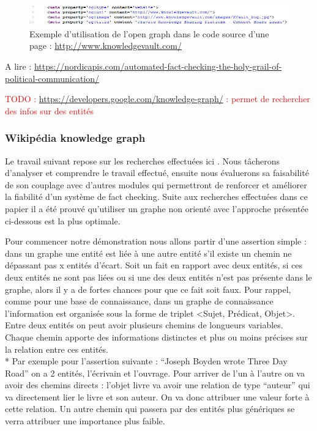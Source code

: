 \documentclass[12pt]{article}
\newcommand\todo[1]{\textcolor{red}{TODO : #1}}
\begin{document}
\cite{dong2014knowledge}

\begin{figure}[ht]
\centering
\includegraphics[width=\textwidth, draft=false]{imgs/og_example.PNG}
\caption{Exemple d'utilisation de l'open graph dans le code source d'une page : \url{http://www.knowledgevault.com/}}
\label{fig1}
\end{figure}

A lire : \url{https://nordicapis.com/automated-fact-checking-the-holy-grail-of-political-communication/}

\todo{\url{https://developers.google.com/knowledge-graph/} : permet de rechercher des infos sur des entités}

\subsubsection{Wikipédia knowledge graph}

\cite{shiralkar2017finding}

\cite{shi2016discriminative}

Le travail suivant repose sur les recherches effectuées ici \cite{ciampaglia2015computational}. Nous tâcherons d'analyser et comprendre le travail effectué, ensuite nous évaluerons sa faisabilité de son couplage avec d'autres modules qui permettront de renforcer et améliorer la fiabilité d'un système de fact checking. Suite aux recherches effectuées dans ce papier il a été prouvé qu'utiliser un graphe non orienté avec l'approche présentée ci-dessous est la plus optimale.

Pour commencer notre démonstration nous allons partir d'une assertion simple : dans un graphe une entité est liée à une autre entité s'il existe un chemin ne dépassant pas  x entités d'écart. Soit un fait en rapport avec deux entités, si ces deux entités ne sont pas liées ou si une des deux entités n'est pas présente dans le graphe, alors il y a de fortes chances pour que ce fait soit faux. Pour rappel, comme pour une base de connaissance, dans un graphe de connaissance l'information est organisée sous la forme de triplet <Sujet, Prédicat, Objet>. Entre deux entités on peut avoir plusieurs chemins de longueurs variables. Chaque chemin apporte des informations distinctes et plus ou moins précises sur la relation entre ces entités.
\\*
Par exemple pour l'assertion suivante : \enquote{Joseph Boyden wrote Three Day Road} on a 2 entités, l'écrivain et l'ouvrage. Pour arriver de l'un à l'autre on va avoir des chemins directs : l'objet livre va avoir une relation de type \enquote{auteur} qui va directement lier le livre et son auteur. On va donc attribuer une valeur forte à cette relation. Un autre chemin qui passera par des entités plus génériques se verra attribuer une importance plus faible.
\end{document}

